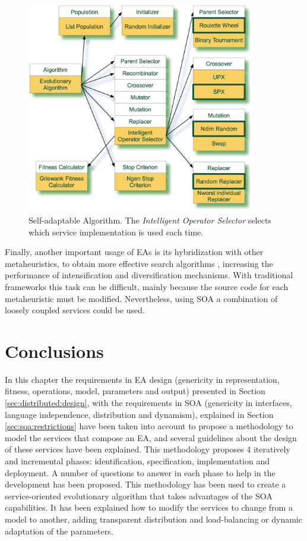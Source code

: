 \begin{figure}
\centering
\includegraphics[width=10cm]{gfx/soaea/intelligent.jpg}
\caption{Self-adaptable Algorithm. The {\em Intelligent Operator Selector} selects which service implementation is used each time.}
\label{INTELLIGENTALGORITHM}
\end{figure}


Finally, another important usage of EAs is its hybridization with other metaheuristics, to obtain more effective search algorithms \cite{HybridRodriguez2012},  increasing the performance of intensification and diversification mechanisms. With  traditional frameworks this task can be difficult, mainly because the source code for each metaheuristic must be modified. Nevertheless, using SOA a combination of loosely coupled services could be used.

\section{Conclusions}
In this chapter the requirements in EA design (genericity in representation, fitness, operations, model, parameters and output) presented in Section \ref{sec:distributed:design}, with the requirements in SOA (genericity in interfaces, language independence, distribution and dynamism), explained in Section \ref{sec:soa:restrictions} have been taken into account to propose a methodology to model the services that compose an EA, and several guidelines about the design of these services have been explained. This methodology proposes 4 iteratively and incremental phases: identification, specification, implementation and deployment. A number of questions to answer in each phase to help in the development has been proposed. This methodology has been used to create a service-oriented evolutionary algorithm that takes advantages of the SOA capabilities. It has been explained how to modify the services to change from a model to another, adding transparent distribution and load-balancing or dynamic adaptation of the parameters.

